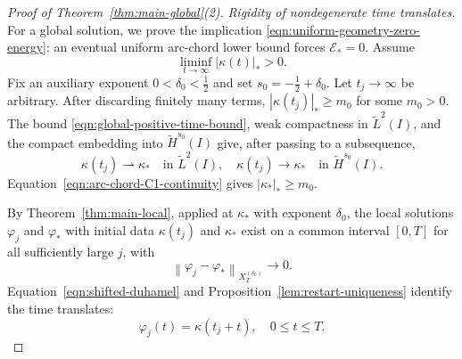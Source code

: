 \documentclass[11pt,reqno]{amsart}
\theoremstyle{plain}
\theoremstyle{definition}
\numberwithin{equation}{section}
\newcommand{\mc}[1]{\mathcal{#1}}
\newcommand{\wt}[1]{\widetilde{#1}}
\newcommand{\abs}[1]{\left\lvert #1 \right\rvert}
\newcommand{\norm}[1]{\left\lVert #1 \right\rVert}
\newcommand{\vph}{\varphi}
\newcommand{\thi}[1]{\wt H^{#1}(I)}
\begin{document}
\begin{proof}[Proof of Theorem~\ref{thm:main-global}(2)]
\emph{Rigidity of nondegenerate time translates.}
For a global solution, we prove the implication
\eqref{eqn:uniform-geometry-zero-energy}: an eventual uniform arc-chord
lower bound forces $\mc E_*=0$. Assume
\begin{equation}\label{eqn:global-uniform-geometry}
    \liminf_{t\to\infty}\abs{\kappa(t)}_*>0.
\end{equation}
Fix an auxiliary exponent $0<\delta_0<\frac12$ and set
$s_0=-\frac12+\delta_0$. Let $t_j\to\infty$ be arbitrary. After discarding
finitely many terms, $\abs{\kappa(t_j)}_*\ge m_0$ for some $m_0>0$. The bound
\eqref{eqn:global-positive-time-bound}, weak compactness in $\wt L^2(I)$,
and the compact embedding into $\thi{s_0}$ give, after passing to a
subsequence,
\begin{equation}\label{eqn:global-translate-data}
    \kappa(t_j)\rightharpoonup\kappa_*
    \quad\text{in }\wt L^2(I),
    \quad
    \kappa(t_j)\longrightarrow\kappa_*
    \quad\text{in }\thi{s_0}.
\end{equation}
Equation~\eqref{eqn:arc-chord-C1-continuity} gives
$\abs{\kappa_*}_*\ge m_0$.

By Theorem~\ref{thm:main-local}, applied at $\kappa_*$ with exponent $\delta_0$,
the local solutions $\vph_j$ and $\vph_*$ with initial data $\kappa(t_j)$ and
$\kappa_*$ exist on a common interval $[0,T]$ for all sufficiently large $j$,
with
\begin{equation}\label{eqn:global-translate-solutions}
    \norm{\vph_j-\vph_*}_{X_T^{(\delta_0)}}\longrightarrow0.
\end{equation}
Equation~\eqref{eqn:shifted-duhamel} and
Proposition~\ref{lem:restart-uniqueness} identify the time translates:
\begin{equation}\label{eqn:time-shift-global}
    \vph_j(t)=\kappa(t_j+t),
    \quad 0\le t\le T.
\end{equation}


\end{proof}
\end{document}
